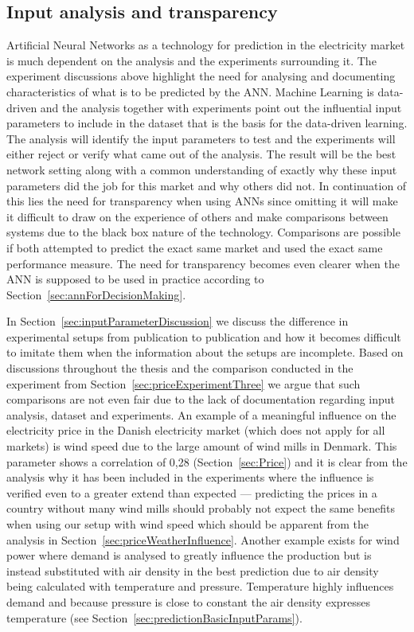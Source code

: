 \subsection{Input analysis and transparency}
Artificial Neural Networks as a technology for prediction in the electricity market is much dependent on the analysis and the experiments surrounding it. The experiment discussions above highlight the need for analysing and documenting characteristics of what is to be predicted by the ANN. Machine Learning is data-driven\cite{18} and the analysis together with experiments point out the influential input parameters to include in the dataset that is the basis for the data-driven learning. The analysis will identify the input parameters to test and the experiments will either reject or verify what came out of the analysis. The result will be the best network setting along with a common understanding of exactly why these input parameters did the job for this market and why others did not. In continuation of this lies the need for transparency when using ANNs since omitting it will make it difficult to draw on the experience of others and make comparisons between systems due to the black box nature of the technology. Comparisons are possible if both attempted to predict the exact same market and used the exact same performance measure. The need for transparency becomes even clearer when the ANN is supposed to be used in practice according to Section~\ref{sec:annForDecisionMaking}. 

In Section~\ref{sec:inputParameterDiscussion} we discuss the difference in experimental setups from publication to publication and how it becomes difficult to imitate them when the information about the setups are incomplete. Based on discussions throughout the thesis and the comparison conducted in the experiment from Section~\ref{sec:priceExperimentThree} we argue that such comparisons are not even fair due to the lack of documentation regarding input analysis, dataset and experiments. An example of a meaningful influence on the electricity price in the Danish electricity market (which does not apply for all markets) is wind speed due to the large amount of wind mills in Denmark. This parameter shows a correlation of 0,28 (Section~\ref{sec:Price}) and it is clear from the analysis why it has been included in the experiments where the influence is verified even to a greater extend than expected --- predicting the prices in a country without many wind mills should probably not expect the same benefits when using our setup with wind speed which should be apparent from the analysis in Section~\ref{sec:priceWeatherInfluence}. Another example exists for wind power where demand is analysed to greatly influence the production but is instead substituted with air density in the best prediction due to air density being calculated with temperature and pressure. Temperature highly influences demand and because pressure is close to constant the air density expresses temperature (see Section~\ref{sec:predictionBasicInputParams}). 

